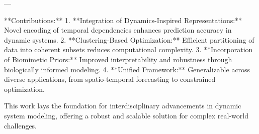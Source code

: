 ---

**Contributions:**  
1. **Integration of Dynamics-Inspired Representations:** Novel encoding of temporal dependencies enhances prediction accuracy in dynamic systems.  
2. **Clustering-Based Optimization:** Efficient partitioning of data into coherent subsets reduces computational complexity.  
3. **Incorporation of Biomimetic Priors:** Improved interpretability and robustness through biologically informed modeling.  
4. **Unified Framework:** Generalizable across diverse applications, from spatio-temporal forecasting to constrained optimization.  

This work lays the foundation for interdisciplinary advancements in dynamic system modeling, offering a robust and scalable solution for complex real-world challenges.  